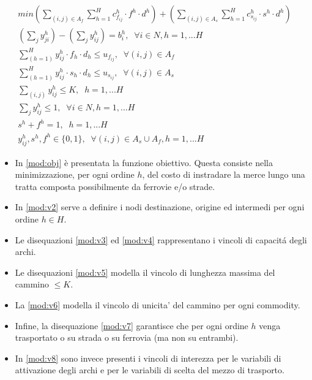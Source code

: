 \documentclass{article}
\begin{document}
\label{problem1}
\begin{align}
    min (\sum_{(i,j) \in A_f}\sum_{h=1}^H c_{f_{ij}}^h \cdot f^h \cdot d^h) +
    (\sum_{(i,j) \in A_s}\sum_{h=1}^H c_{s_{ij}}^h \cdot s^h \cdot d^h )
    \label{mod:obj}
    \\
    (\sum_{j}y_{ji}^h)- (\sum_{j}y_{ij}^h ) = b_i^h, \; \; \forall i \in N, h=1, ... H
    \label{mod:v2}
    \\
    \sum_{(h=1)}^H y_{ij}^h \cdot f_h \cdot d_h \leq u_{f_{ij}}, \; \; \forall (i,j) \in A_f
    \label{mod:v3}
    \\
    \sum_{(h=1)}^H y_{ij}^h \cdot s_h \cdot d_h \leq u_{s_{ij}}, \; \; \forall (i,j) \in A_s
    \label{mod:v4}
    \\
    \sum_{(i,j)} y_{ij}^h  \leq K, \; \; h=1, ... H
    \label{mod:v5}
    \\
    \sum_{j} y_{ij}^h \leq 1, \; \; \forall i \in \textit{N} , h=1, ... H
    \label{mod:v6}
    \\
    s^h + f^h = 1 , \; \;  h=1, ... H
    \label{mod:v7}
    \\
    y_{ij}^h, s^h, f^h \in \{0,1\}, \; \; \forall (i,j) \in A_s \cup A_f , h=1, ... H
    \label{mod:v8}
\end{align}

\begin{itemize}
    \item In \eqref{mod:obj} è presentata la funzione obiettivo. Questa consiste nella minimizzazione, per ogni ordine $h$, del costo di instradare la merce lungo una tratta composta possibilmente da ferrovie e/o strade.
    \item In \eqref{mod:v2} serve a definire i nodi destinazione, origine ed intermedi per ogni ordine $h \in H$.
    \item Le disequazioni \eqref{mod:v3} ed \eqref{mod:v4} rappresentano i vincoli di capacit\'a degli archi.
    \item Le disequazioni \eqref{mod:v5} modella il vincolo di lunghezza massima del cammino $\leq K$. 
    \item La \eqref{mod:v6} modella il vincolo di unicita' del cammino per ogni commodity.
    \item Infine, la disequazione \eqref{mod:v7} garantisce che per ogni ordine $h$ venga trasportato o su strada o su ferrovia (ma non su entrambi).
    \item In \eqref{mod:v8} sono invece presenti i vincoli di interezza per le variabili di attivazione degli archi e per le variabili di scelta del mezzo di trasporto.

\end{itemize}
\end{document}
